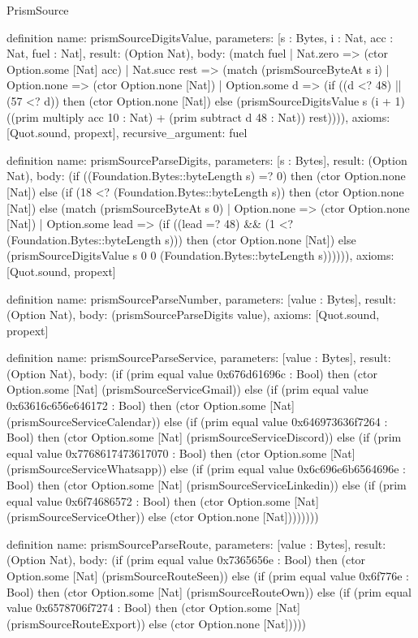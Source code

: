 \begin{lexlean}{PrismSource}
\begin{semanticmodule}
definition{
  name: prismSourceDigitsValue,
  parameters: [s : Bytes, i : Nat, acc : Nat, fuel : Nat],
  result: (Option Nat),
  body: (match fuel
    | Nat.zero => (ctor Option.some [Nat] acc)
    | Nat.succ rest => (match (prismSourceByteAt s i)
      | Option.none => (ctor Option.none [Nat])
      | Option.some d => (if ((d <? 48) || (57 <? d)) then (ctor Option.none [Nat]) else (prismSourceDigitsValue s (i + 1) ((prim multiply acc 10 : Nat) + (prim subtract d 48 : Nat)) rest)))),
  axioms: [Quot.sound, propext],
  recursive_argument: fuel
}

definition{
  name: prismSourceParseDigits,
  parameters: [s : Bytes],
  result: (Option Nat),
  body: (if ((Foundation.Bytes::byteLength s) =? 0) then (ctor Option.none [Nat]) else (if (18 <? (Foundation.Bytes::byteLength s)) then (ctor Option.none [Nat]) else (match (prismSourceByteAt s 0)
    | Option.none => (ctor Option.none [Nat])
    | Option.some lead => (if ((lead =? 48) && (1 <? (Foundation.Bytes::byteLength s))) then (ctor Option.none [Nat]) else (prismSourceDigitsValue s 0 0 (Foundation.Bytes::byteLength s)))))),
  axioms: [Quot.sound, propext]
}

definition{
  name: prismSourceParseNumber,
  parameters: [value : Bytes],
  result: (Option Nat),
  body: (prismSourceParseDigits value),
  axioms: [Quot.sound, propext]
}

definition{
  name: prismSourceParseService,
  parameters: [value : Bytes],
  result: (Option Nat),
  body: (if (prim equal value 0x676d61696c : Bool) then (ctor Option.some [Nat] (prismSourceServiceGmail)) else (if (prim equal value 0x63616c656e646172 : Bool) then (ctor Option.some [Nat] (prismSourceServiceCalendar)) else (if (prim equal value 0x646973636f7264 : Bool) then (ctor Option.some [Nat] (prismSourceServiceDiscord)) else (if (prim equal value 0x7768617473617070 : Bool) then (ctor Option.some [Nat] (prismSourceServiceWhatsapp)) else (if (prim equal value 0x6c696e6b6564696e : Bool) then (ctor Option.some [Nat] (prismSourceServiceLinkedin)) else (if (prim equal value 0x6f74686572 : Bool) then (ctor Option.some [Nat] (prismSourceServiceOther)) else (ctor Option.none [Nat])))))))
}

definition{
  name: prismSourceParseRoute,
  parameters: [value : Bytes],
  result: (Option Nat),
  body: (if (prim equal value 0x7365656e : Bool) then (ctor Option.some [Nat] (prismSourceRouteSeen)) else (if (prim equal value 0x6f776e : Bool) then (ctor Option.some [Nat] (prismSourceRouteOwn)) else (if (prim equal value 0x6578706f7274 : Bool) then (ctor Option.some [Nat] (prismSourceRouteExport)) else (ctor Option.none [Nat]))))
}


\end{semanticmodule}
\end{lexlean}
